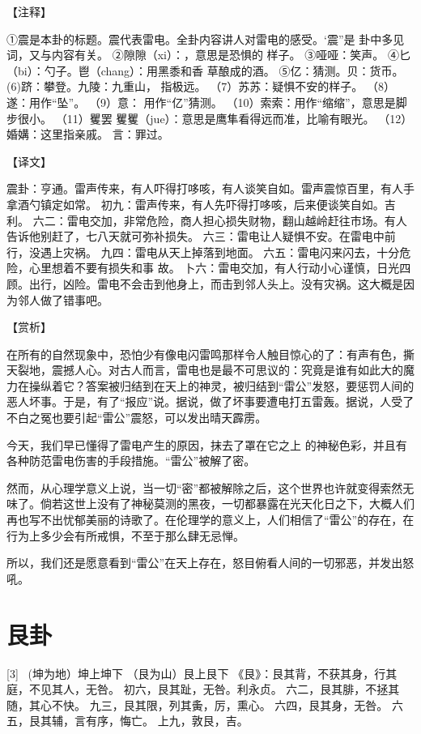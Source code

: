\documentclass[12pt,UTF8]{ctexbook}
\begin{document}
【注释】

①震是本卦的标题。震代表雷电。全卦内容讲人对雷电的感受。‘震”是 卦中多见词，又与内容有关。
②隙隙（xi）：，意思是恐惧的 样子。
③哑哑：笑声。
④匕（bi）：勺子。鬯（chang）：用黑黍和香 草酿成的酒。
⑤亿：猜测。贝：货币。
(6)跻：攀登。九陵：九重山， 指极远。
（7）苏苏：疑惧不安的样子。
（8）遂：用作“坠”。
（9）意： 用作“亿”猜测。
（10）索索：用作“缩缩”，意思是脚步很小。
（11）矍罢 矍矍（jue）：意思是鹰隼看得远而准，比喻有眼光。
（12）婚媾：这里指亲戚。 言：罪过。

【译文】

震卦：亨通。雷声传来，有人吓得打哆咳，有人谈笑自如。雷声震惊百里，有人手拿酒勺镇定如常。
初九：雷声传来，有人先吓得打哆咳，后来便谈笑自如。吉利。
六二：雷电交加，非常危险，商人担心损失财物，翻山越岭赶往市场。有人告诉他别赶了，七八天就可弥补损失。
六三：雷电让人疑惧不安。在雷电中前行，没遇上灾祸。
九四：雷电从天上掉落到地面。 六五：雷电闪来闪去，十分危险，心里想着不要有损失和事 故。
卜六：雷电交加，有人行动小心谨慎，日光四顾。出行，凶险。雷电不会击到他身上，而击到邻人头上。没有灾祸。这大概是因为邻人做了错事吧。

【赏析】

在所有的自然现象中，恐怕少有像电闪雷鸣那样令人触目惊心的了：有声有色，撕天裂地，震撼人心。对古人而言，雷电也是最不可思议的：究竟是谁有如此大的魔力在操纵着它？答案被归结到在天上的神灵，被归结到“雷公”发怒，要惩罚人间的恶人坏事。于是，有了“报应”说。据说，做了坏事要遭电打五雷轰。据说，人受了不白之冤也要引起“雷公”震怒，可以发出晴天霹雳。

今天，我们早已懂得了雷电产生的原因，抹去了罩在它之上 的神秘色彩，并且有各种防范雷电伤害的手段措施。“雷公”被解了密。

然而，从心理学意义上说，当一切“密”都被解除之后，这个世界也许就变得索然无味了。倘若这世上没有了神秘莫测的黑夜，一切都暴露在光天化日之下，大概人们再也写不出忧郁美丽的诗歌了。在伦理学的意义上，人们相信了“雷公”的存在，在行为上多少会有所戒惧，不至于那么肆无忌惮。

所以，我们还是愿意看到“雷公”在天上存在，怒目俯看人间的一切邪恶，并发出怒吼。

\chapter{艮卦}
[3] \ (坤为地）坤上坤下
（艮为山）艮上艮下
《艮》：艮其背，不获其身，行其庭，不见其人，无咎。
初六，艮其趾，无咎。利永贞。
六二，艮其腓，不拯其随，其心不快。
九三，艮其限，列其夤，厉，熏心。
六四，艮其身，无咎。
六五，艮其辅，言有序，悔亡。
上九，敦艮，吉。
\end{document}
